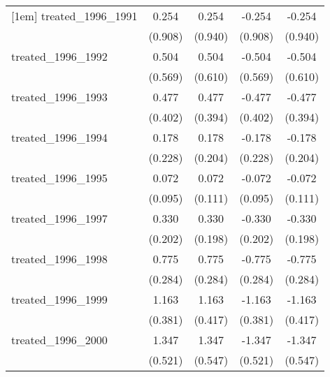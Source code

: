 {\begin{tabular}{l*{4}{c}}
[1em]
treated\_1996\_1991&       0.254         &       0.254         &      -0.254         &      -0.254         \\
            &     (0.908)         &     (0.940)         &     (0.908)         &     (0.940)         \\
[1em]
treated\_1996\_1992&       0.504         &       0.504         &      -0.504         &      -0.504         \\
            &     (0.569)         &     (0.610)         &     (0.569)         &     (0.610)         \\
[1em]
treated\_1996\_1993&       0.477         &       0.477         &      -0.477         &      -0.477         \\
            &     (0.402)         &     (0.394)         &     (0.402)         &     (0.394)         \\
[1em]
treated\_1996\_1994&       0.178         &       0.178         &      -0.178         &      -0.178         \\
            &     (0.228)         &     (0.204)         &     (0.228)         &     (0.204)         \\
[1em]
treated\_1996\_1995&       0.072         &       0.072         &      -0.072         &      -0.072         \\
            &     (0.095)         &     (0.111)         &     (0.095)         &     (0.111)         \\
[1em]
treated\_1996\_1997&       0.330         &       0.330         &      -0.330         &      -0.330         \\
            &     (0.202)         &     (0.198)         &     (0.202)         &     (0.198)         \\
[1em]
treated\_1996\_1998&       0.775\sym{**} &       0.775\sym{**} &      -0.775\sym{**} &      -0.775\sym{**} \\
            &     (0.284)         &     (0.284)         &     (0.284)         &     (0.284)         \\
[1em]
treated\_1996\_1999&       1.163\sym{**} &       1.163\sym{**} &      -1.163\sym{**} &      -1.163\sym{**} \\
            &     (0.381)         &     (0.417)         &     (0.381)         &     (0.417)         \\
[1em]
treated\_1996\_2000&       1.347\sym{**} &       1.347\sym{*}  &      -1.347\sym{**} &      -1.347\sym{*}  \\
            &     (0.521)         &     (0.547)         &     (0.521)         &     (0.547)         \\

\end{tabular}}
